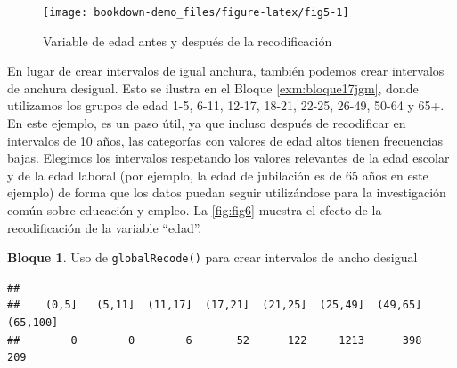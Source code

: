 \documentclass[]{book}
\newenvironment{Shaded}{\begin{snugshade}}{\end{snugshade}}
\newcommand{\CommentTok}[1]{\textcolor[rgb]{0.56,0.35,0.01}{\textit{#1}}}
\newcommand{\DataTypeTok}[1]{\textcolor[rgb]{0.13,0.29,0.53}{#1}}
\newcommand{\DecValTok}[1]{\textcolor[rgb]{0.00,0.00,0.81}{#1}}
\newcommand{\KeywordTok}[1]{\textcolor[rgb]{0.13,0.29,0.53}{\textbf{#1}}}
\newcommand{\NormalTok}[1]{#1}
\newcommand{\OperatorTok}[1]{\textcolor[rgb]{0.81,0.36,0.00}{\textbf{#1}}}
\newcommand{\StringTok}[1]{\textcolor[rgb]{0.31,0.60,0.02}{#1}}
\theoremstyle{definition}
\theoremstyle{definition}
\newtheorem{example}{Bloque}[chapter]
\theoremstyle{definition}
\theoremstyle{definition}
\theoremstyle{remark}
\begin{document}
\begin{figure}
\texttt{[image: bookdown-demo\_files/figure-latex/fig5-1]} \caption{Variable de edad antes y después de la recodificación}\label{fig:fig5}
\end{figure}

En lugar de crear intervalos de igual anchura, también podemos crear intervalos de anchura desigual. Esto se ilustra en el Bloque \ref{exm:bloque17jgm}, donde utilizamos los grupos de edad 1-5, 6-11, 12-17, 18-21, 22-25, 26-49, 50-64 y 65+. En este ejemplo, es un paso útil, ya que incluso después de recodificar en intervalos de 10 años, las categorías con valores de edad altos tienen frecuencias bajas. Elegimos los intervalos respetando los valores relevantes de la edad escolar y de la edad laboral (por ejemplo, la edad de jubilación es de 65 años en este ejemplo) de forma que los datos puedan seguir utilizándose para la investigación común sobre educación y empleo. La \ref{fig:fig6} muestra el efecto de la recodificación de la variable ``edad''.

\begin{example}
\protect\hypertarget{exm:bloque17jgm}{}{\label{exm:bloque17jgm} }Uso de \texttt{globalRecode()} para crear intervalos de ancho desigual
\end{example}

\begin{Shaded}
\end{Shaded}

\begin{verbatim}
## 
##    (0,5]   (5,11]  (11,17]  (17,21]  (21,25]  (25,49]  (49,65] (65,100] 
##        0        0        6       52      122     1213      398      209
\end{verbatim}
\end{document}
